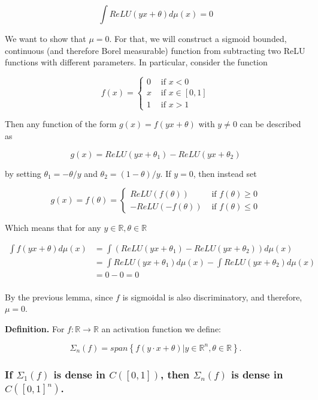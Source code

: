 $$
\int ReLU(y x+\theta) d \mu(x)=0
$$

We want to show that $\mu=0$. For that, we will construct a sigmoid bounded, continuous (and therefore Borel measurable) function from subtracting two ReLU functions with different parameters. In particular, consider the function

$$
f(x)=\left\{\begin{array}{ll}
0 & \text { if } x<0 \\
x & \text { if } x \in[0,1] \\
1 & \text { if } x>1
\end{array}\right.
$$

Then any function of the form $g(x)=f(y x+\theta)$ with $y \neq 0$ can be described as

$$
g(x)=ReLU\left(y x+\theta_1\right)-ReLU\left(y x+\theta_2\right)
$$

by setting $\theta_1=-\theta / y$ and $\theta_2=(1-\theta) / y$. If $y=0$, then instead set

$$
g(x)=f(\theta)=\left\{\begin{array}{ll}
ReLU(f(\theta)) & \text { if } f(\theta) \geq 0 \\
-ReLU(-f(\theta)) & \text { if } f(\theta) \leq 0
\end{array}\right.
$$

Which means that for any $y \in \mathbb{R}, \theta \in \mathbb{R}$

\[
\begin{split}
    \int f(y x+\theta) d \mu(x) &=\int\left(ReLU\left(y x+\theta_1\right)-ReLU\left(y x+\theta_2\right)\right) d \mu(x) \\
&=\int ReLU\left(y x+\theta_1\right) d \mu(x)-\int ReLU\left(y x+\theta_2\right) d \mu(x) \\
&=0-0=0 \\
\end{split}
\]

By the previous lemma, since $f$ is sigmoidal is also discriminatory, and therefore, $\mu=0$.

\textbf{Definition.} For $f: \mathbb{R}\rightarrow \mathbb{R}$ an activation function we define:

$$
\Sigma_n(f)=span\left\{f(y\cdot x+ \theta)|y\in \mathbb{R}^n, \theta \in \mathbb{R}\right\}.
$$

\subsubsection*{If \(\Sigma_1(f)\) is dense in \(C([0,1])\), then \(\Sigma_n(f)\) is dense in \(C([0,1]^n)\).} 


